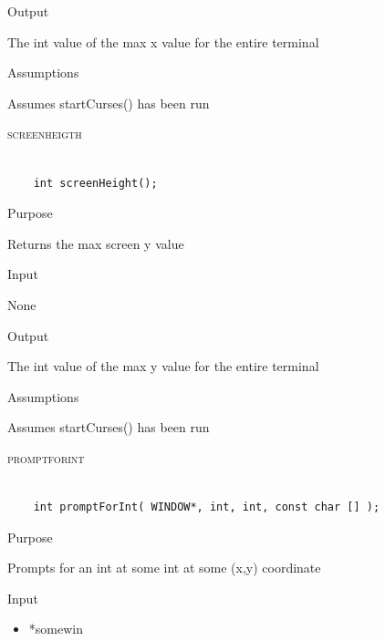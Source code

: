 \documentclass[pdftex, 11pt]{article}
\begin{document}
\begin{description}
\begin{description}
			\item{Output}

				The int value of the max x value for the entire terminal

			\item{Assumptions}

				Assumes startCurses() has been run

		\end{description}


	\item{\textsc{screenheigth}}

		\begin{lstlisting}

	int screenHeight();
		\end{lstlisting}

		\begin{description}
			\item{Purpose}

				Returns the max screen y value

			\item{Input}

				None

			\item{Output}

				The int value of the max y value for the entire terminal

			\item{Assumptions}

				Assumes startCurses() has been run

		\end{description}


	\item{\textsc{promptforint}}

		\begin{lstlisting}

	int promptForInt( WINDOW*, int, int, const char [] );
		\end{lstlisting}

		\begin{description}
			\item{Purpose}

				Prompts for an int at some int at some (x,y) coordinate

			\item{Input}

				\begin{itemize}

					\item{*somewin}


\end{itemize}
\end{description}
\end{description}
\end{document}
